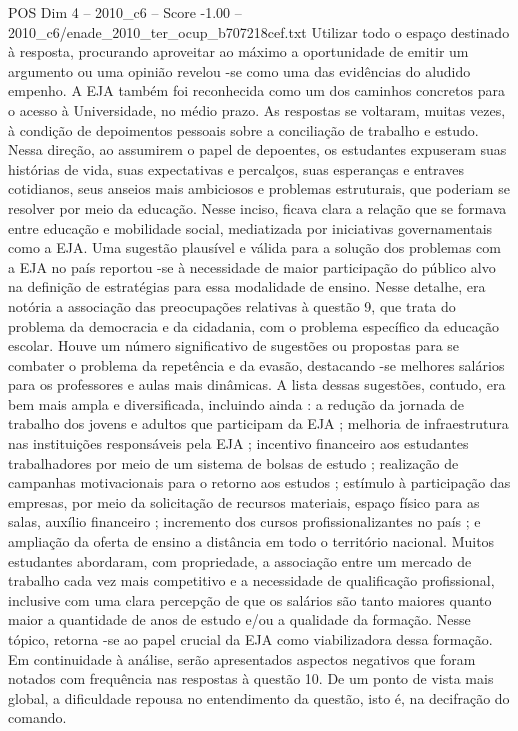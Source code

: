 \begin{textsample}{POS Dim 4 – 2010\_c6 – Score -1.00 – 2010\_c6/enade\_2010\_ter\_ocup\_b707218cef.txt}
Utilizar todo o espaço destinado à resposta, procurando aproveitar ao máximo a oportunidade de emitir um argumento ou uma opinião revelou -se como uma das evidências do aludido empenho.
A EJA também foi reconhecida como um dos caminhos concretos para o acesso à Universidade, no médio prazo.
As respostas se voltaram, muitas vezes, à condição de depoimentos pessoais sobre a conciliação de trabalho e estudo.
Nessa direção, ao assumirem o papel de depoentes, os estudantes expuseram suas histórias de vida, suas expectativas e percalços, suas esperanças e entraves cotidianos, seus anseios mais ambiciosos e problemas estruturais, que poderiam se resolver por meio da educação.
Nesse inciso, ficava clara a relação que se formava entre educação e mobilidade social, mediatizada por iniciativas governamentais como a EJA.
Uma sugestão plausível e válida para a solução dos problemas com a EJA no país reportou -se à necessidade de maior participação do público alvo na definição de estratégias para essa modalidade de ensino.
Nesse detalhe, era notória a associação das preocupações relativas à questão 9, que trata do problema da democracia e da cidadania, com o problema específico da educação escolar.
Houve um número significativo de sugestões ou propostas para se combater o problema da repetência e da evasão, destacando -se melhores salários para os professores e aulas mais dinâmicas.
A lista dessas sugestões, contudo, era bem mais ampla e diversificada, incluindo ainda : a redução da jornada de trabalho dos jovens e adultos que participam da EJA ; melhoria de infraestrutura nas instituições responsáveis pela EJA ; incentivo financeiro aos estudantes trabalhadores por meio de um sistema de bolsas de estudo ; realização de campanhas motivacionais para o retorno aos estudos ; estímulo à participação das empresas, por meio da solicitação de recursos materiais, espaço físico para as salas, auxílio financeiro ; incremento dos cursos profissionalizantes no país ; e ampliação da oferta de ensino a distância em todo o território nacional.
Muitos estudantes abordaram, com propriedade, a associação entre um mercado de trabalho cada vez mais competitivo e a necessidade de qualificação profissional, inclusive com uma clara percepção de que os salários são tanto maiores quanto maior a quantidade de anos de estudo e/ou a qualidade da formação.
Nesse tópico, retorna -se ao papel crucial da EJA como viabilizadora dessa formação.
Em continuidade à análise, serão apresentados aspectos negativos que foram notados com frequência nas respostas à questão 10.
De um ponto de vista mais global, a dificuldade repousa no entendimento da questão, isto é, na decifração do comando.

\end{textsample}
